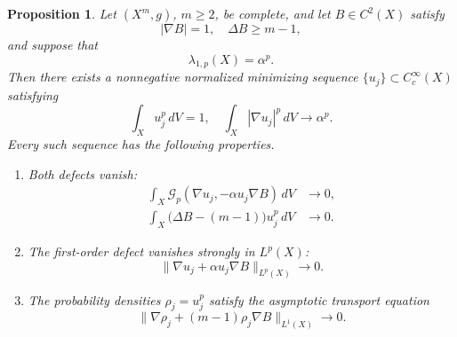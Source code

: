 \documentclass[12pt]{amsart}
\newtheorem{proposition}[theorem]{Proposition}
\theoremstyle{definition}
\numberwithin{equation}{section}
\newcommand{\mc}{\mathcal}
\begin{document}
\begin{proposition}\label{prop:p-critical-sequence}
Let \((X^m,g)\), \(m\geq2\), be complete, and let \(B\in C^2(X)\)
satisfy
\[
  |\nabla B|=1,
  \quad
  \Delta B\geq m-1,
\]
and suppose that
\[
  \lambda_{1,p}(X)=\alpha^p.
\]
Then there exists a nonnegative normalized minimizing sequence
\(\{u_j\}\subset C_c^\infty(X)\) satisfying
\[
  \int_Xu_j^p\,dV=1,
  \quad
  \int_X|\nabla u_j|^p\,dV\longrightarrow\alpha^p.
\]
Every such sequence has the following properties.
\begin{enumerate}[label=\textup{(\roman*)}]
\item Both defects vanish:
\begin{equation}\label{eq:p-two-defects}
\begin{split}
  \int_X\mc G_p(\nabla u_j,-\alpha u_j\nabla B)\,dV
  &\longrightarrow0,\\
  \int_X\bigl(\Delta B-(m-1)\bigr)u_j^p\,dV
  &\longrightarrow0.
\end{split}
\end{equation}
\item The first-order defect vanishes strongly in \(L^p(X)\):
\begin{equation}\label{eq:p-first-order-convergence}
  \|\nabla u_j+\alpha u_j\nabla B\|_{L^p(X)}
  \longrightarrow0.
\end{equation}
\item The probability densities \(\rho_j=u_j^p\) satisfy the
asymptotic transport equation
\begin{equation}\label{eq:p-density-transport}
  \|\nabla\rho_j+(m-1)\rho_j\nabla B\|_{L^1(X)}
  \longrightarrow0.
\end{equation}
\end{enumerate}
\end{proposition}
\end{document}
